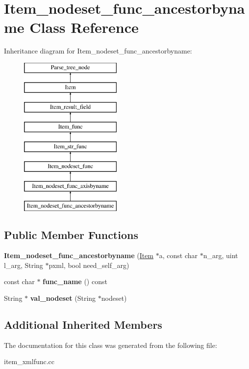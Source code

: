 \hypertarget{classItem__nodeset__func__ancestorbyname}{}\section{Item\+\_\+nodeset\+\_\+func\+\_\+ancestorbyname Class Reference}
\label{classItem__nodeset__func__ancestorbyname}
Inheritance diagram for Item\+\_\+nodeset\+\_\+func\+\_\+ancestorbyname\+:\begin{figure}[H]
\begin{center}
\leavevmode
\includegraphics[height=8.000000cm]{classItem__nodeset__func__ancestorbyname}
\end{center}
\end{figure}
\subsection*{Public Member Functions}
\begin{DoxyCompactItemize}
\item 
\mbox{\label{classItem__nodeset__func__ancestorbyname_af18669d5669571bf467d3ccdacc92916}} 
{\bfseries Item\+\_\+nodeset\+\_\+func\+\_\+ancestorbyname} (\mbox{\hyperlink{classItem}{Item}} $\ast$a, const char $\ast$n\+\_\+arg, uint l\+\_\+arg, String $\ast$pxml, bool need\+\_\+self\+\_\+arg)
\item 
\mbox{\label{classItem__nodeset__func__ancestorbyname_a8ef5a5d36a5ab0e79ccae11fa83357d3}} 
const char $\ast$ {\bfseries func\+\_\+name} () const
\item 
\mbox{\label{classItem__nodeset__func__ancestorbyname_aedba297c5b7f35abae6a87556ecace89}} 
String $\ast$ {\bfseries val\+\_\+nodeset} (String $\ast$nodeset)
\end{DoxyCompactItemize}
\subsection*{Additional Inherited Members}


The documentation for this class was generated from the following file\+:\begin{DoxyCompactItemize}
\item 
item\+\_\+xmlfunc.\+cc\end{DoxyCompactItemize}
